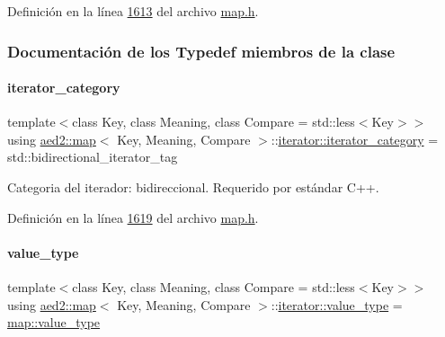 Definición en la línea \hyperlink{map_8h_source_l01613}{1613} del archivo \hyperlink{map_8h_source}{map.\+h}.



\subsubsection{Documentación de los \textquotesingle{}Typedef\textquotesingle{} miembros de la clase}
\mbox{\label{classaed2_1_1map_1_1iterator_a709df3d8aef6fd1eeb839616b554ff0b_a709df3d8aef6fd1eeb839616b554ff0b}} 
\paragraph{\texorpdfstring{iterator\+\_\+category}{iterator\_category}}
{\footnotesize\ttfamily template$<$class Key, class Meaning, class Compare = std\+::less$<$\+Key$>$$>$ \\
using \hyperlink{classaed2_1_1map}{aed2\+::map}$<$ Key, Meaning, Compare $>$\+::\hyperlink{classaed2_1_1map_1_1iterator_a709df3d8aef6fd1eeb839616b554ff0b_a709df3d8aef6fd1eeb839616b554ff0b}{iterator\+::iterator\+\_\+category} =  std\+::bidirectional\+\_\+iterator\+\_\+tag}



Categoria del iterador\+: bidireccional. Requerido por estándar C++. 



Definición en la línea \hyperlink{map_8h_source_l01619}{1619} del archivo \hyperlink{map_8h_source}{map.\+h}.

\mbox{\label{classaed2_1_1map_1_1iterator_a4e1d954ef5c6a64bbcd881854f039a16_a4e1d954ef5c6a64bbcd881854f039a16}} 
\paragraph{\texorpdfstring{value\+\_\+type}{value\_type}}
{\footnotesize\ttfamily template$<$class Key, class Meaning, class Compare = std\+::less$<$\+Key$>$$>$ \\
using \hyperlink{classaed2_1_1map}{aed2\+::map}$<$ Key, Meaning, Compare $>$\+::\hyperlink{classaed2_1_1map_1_1iterator_a4e1d954ef5c6a64bbcd881854f039a16_a4e1d954ef5c6a64bbcd881854f039a16}{iterator\+::value\+\_\+type} =  \hyperlink{classaed2_1_1map_a719db98e0ff9a837610f76be33264680_a719db98e0ff9a837610f76be33264680}{map\+::value\+\_\+type}}



